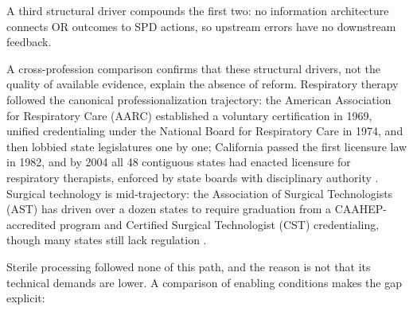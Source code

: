\documentclass[10pt,a4paper]{article}
\begin{document}
A third structural driver compounds the first two: no information architecture connects OR outcomes to SPD actions, so upstream errors have no downstream feedback.

A cross-profession comparison confirms that these structural drivers,
not the quality of available evidence, explain the absence of reform.
Respiratory therapy followed the canonical professionalization
trajectory: the American Association for Respiratory Care (AARC)
established a voluntary certification in 1969, unified credentialing
under the National Board for Respiratory Care in 1974, and then
lobbied state legislatures one by one; California passed the first
licensure law in 1982, and by 2004 all 48 contiguous states had
enacted licensure for respiratory therapists, enforced by state boards
with disciplinary authority
\cite{aarc-timeline}.
Surgical technology is mid-trajectory: the Association of Surgical
Technologists (AST) has driven over a dozen states to require
graduation from a CAAHEP-accredited program and Certified Surgical
Technologist (CST) credentialing, though many states still lack
regulation
\cite{ast-state-laws}.

Sterile processing followed none of this path, and the reason is not
that its technical demands are lower. A comparison of enabling
conditions makes the gap explicit:
\end{document}
